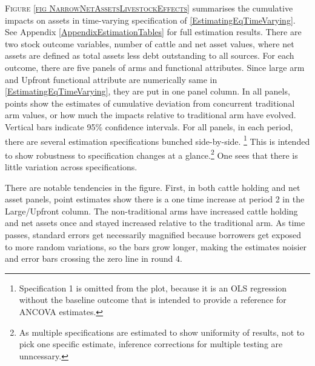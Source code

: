 	\textsc{\footnotesize Figure \ref{fig NarrowNetAssetsLivestockEffects}} summarises the cumulative impacts on assets in time-varying specification of \eqref{EstimatingEqTimeVarying}.  See Appendix \ref{AppendixEstimationTables} for full estimation results. There are two stock outcome variables,  number of cattle and net asset values, where net assets are defined as total assets less debt outstanding to all sources. For each outcome, there are five panels of arms and functional attributes. Since \textsf{large} arm and \textsf{Upfront} functional attribute are numerically same in \eqref{EstimatingEqTimeVarying}, they are put in one panel column. In all panels, points show the estimates of cumulative deviation from concurrent \textsf{traditional} arm values, or how much the impacts relative to \textsf{traditional} arm have evolved. Vertical bars indicate 95\% confidence intervals. 
	For all panels, in each period, there are several estimation specifications bunched side-by-side. \footnote{Specification 1 is omitted from the plot, because it is an OLS regression without the baseline outcome that is intended to provide a reference for ANCOVA estimates. } This is intended to show robustness to specification changes at a glance.\footnote{As multiple specifications are estimated to show uniformity of results, not to pick one specific estimate, inference corrections for multiple testing are unncessary. } One sees that there is little variation across specifications. %
	
	There are notable tendencies in the figure. First, in both cattle holding and net asset panels, point estimates show there is a one time increase at period 2 in the \textsf{Large/Upfront} column. %
	The non-\textsf{traditional} arms have increased cattle holding and net assets once and stayed increased relative to the \textsf{traditional} arm. As time passes, standard errors get necessarily magnified because borrowers get exposed to more random variations, so the bars grow longer, making the estimates noisier and error bars crossing the zero line in round 4. %

